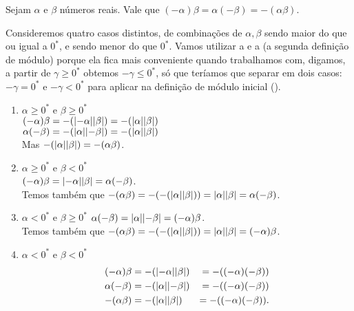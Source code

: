\documentclass[../main.tex]{subfiles}
\begin{document}
\begin{prop}\label{reais-prop-regraSinaisProduto1}
    Sejam $\alpha$ e $\beta$ números reais. Vale que $\left( - \alpha \right) \beta = \alpha \left( -\beta \right) = -\left(\alpha \beta \right) $.
\end{prop}
\begin{dem}
    Consideremos quatro casos distintos, de combinações de $\alpha, \beta$ sendo maior do que ou igual a $0^*$, e sendo menor do que $0^*$. Vamos utilizar a  e a  (a segunda definição de módulo) porque ela fica mais conveniente quando trabalhamos com, digamos, a partir de $\gamma \geq 0^*$ obtemos $-\gamma \leq 0^*$, só que teríamos que separar em dois casos: $-\gamma = 0^*$ e $-\gamma < 0^*$ para aplicar na definição de módulo inicial ().
    \begin{enumerate}
        \item $\alpha \geq 0^*$ e $\beta \geq 0^*$ \\
            $(-\alpha)\beta = -(\abs{-\alpha}\abs{\beta}) = -(\abs{\alpha}\abs{\beta})$ \\
            $\alpha(-\beta) = -(\abs{\alpha}\abs{-\beta}) = -(\abs{\alpha}\abs{\beta})$ \\
            Mas $-(\abs{\alpha}\abs{\beta}) = -(\alpha\beta)$.
        \item $\alpha \geq 0^*$ e $\beta < 0^*$ \\
            $(-\alpha)\beta = \abs{-\alpha}\abs{\beta} = \alpha(-\beta)$.  \\
            Temos também que $-(\alpha \beta) = -(- (\abs{\alpha}\abs{\beta} )) = \abs{\alpha}\abs{\beta} = \alpha(-\beta)$.       
        \item $\alpha < 0^*$ e $\beta \geq 0^*$
            $\alpha(-\beta) = \abs{\alpha}\abs{-\beta} = (-\alpha)\beta$.  \\
            Temos também que $-(\alpha \beta) = -(- (\abs{\alpha}\abs{\beta} )) = \abs{\alpha}\abs{\beta} = (-\alpha)\beta$.       
        \item $\alpha < 0^*$ e $\beta < 0^*$ \\
        \begin{align*}
            (-\alpha) \beta &= -(\abs{-\alpha} \abs{\beta}) &= -((-\alpha)(-\beta)) \\
            \alpha (-\beta) &= -(\abs{\alpha}  \abs{-\beta}) &= -((-\alpha)(-\beta)) \\
            -(\alpha \beta) &= -(\abs{\alpha}  \abs{\beta})  &= -((-\alpha)(-\beta)).
        \end{align*}            
    \end{enumerate}
\end{dem}
\end{document}
